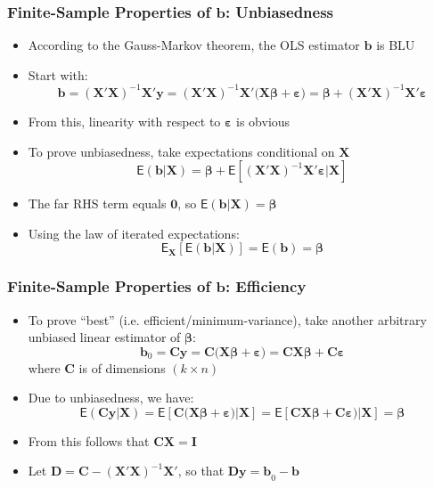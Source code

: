 \documentclass[10pt]{beamer}
\theoremstyle{definition}
\begin{document}
\begin{frame}[fragile]
	\frametitle{Finite-Sample Properties of $\mathbf{b}$: Unbiasedness}
	\begin{itemize}
		\item According to the Gauss-Markov theorem, the OLS estimator $\mathbf{b}$ is BLU
		\item Start with:
		\[
		\mathbf{b} = \mathbf{(X'X)}^{-1}\mathbf{X'y} = \mathbf{(X'X)}^{-1}\mathbf{X'(X}\bm\beta + \bm\varepsilon) = \bm\beta + \mathbf{(X'X)}^{-1}\mathbf{X'}\bm\varepsilon
		\]
		\item From this, linearity with respect to $\bm\varepsilon$ is obvious
		\item To prove unbiasedness, take expectations conditional on $\mathbf{X}$
		\[
		\mathsf{E}(\mathbf{b|X}) = \bm\beta + \mathsf{E}[\mathbf{(X'X)}^{-1}\mathbf{X'}\bm\varepsilon|\mathbf{X}]
		\]
		\item The far RHS term equals $\mathbf{0}$, so $\mathsf{E}(\mathbf{b|X}) = \bm\beta$
		\item Using the law of iterated expectations:
		\[
		\mathsf{E}_{\mathbf{X}}[\mathsf{E}(\mathbf{b|X})] = \mathsf{E}(\mathbf{b}) = \bm\beta
		\]
	\end{itemize}
\end{frame}

\begin{frame}[fragile]
\frametitle{Finite-Sample Properties of $\mathbf{b}$: Efficiency}
\begin{itemize}
	\item To prove ``best'' (i.e. efficient/minimum-variance), take another arbitrary unbiased linear estimator of $\bm\beta$: 
	\[
		\mathbf{b}_{0} = \mathbf{Cy} = \mathbf{C(X}\bm\beta + \bm\varepsilon) = \mathbf{CX}\bm\beta + \mathbf{C}\bm\varepsilon
	\]
	where $\mathbf{C}$ is of dimensions $(k\times n)$
	\item Due to unbiasedness, we have:
	\[
		\mathsf{E}(\mathbf{Cy|X}) = \mathsf{E}[\mathbf{C(X}\bm\beta + \bm\varepsilon)\mathbf{|X}] = \mathsf{E}[\mathbf{CX}\bm\beta + \mathbf{C}\bm\varepsilon)\mathbf{|X}] = \bm\beta
	\]
	\item From this follows that $\mathbf{CX = I}$
	\item Let $\mathbf{D = C - (X'X)}^{-1}\mathbf{X}'$, so that $\mathbf{Dy = b}_{0}-\mathbf{b}$
\end{itemize}
\end{frame}
\end{document}
